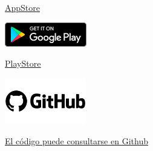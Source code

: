 \documentclass[conference]{IEEEtran}
\begin{document}
\begin{center}
    \href{https://apps.apple.com/mx/app/shannon-entropy/id1566482675}{\underline{AppStore}}
\end{center}


\begin{center}
    \includegraphics{google-play-badge.png}
\end{center}

\begin{center}
    \href{https://play.google.com/store/apps/details?id=com.jonathangg.shannonentropy}{\underline{PlayStore}}    
\end{center}


\begin{center}
    \includegraphics[height=2cm]{github.png}
\end{center}
\begin{center}
    \href{https://play.google.com/store/apps/details?id=com.jonathangg.shannonentropy}{\underline{El código puede consultarse en Github}}    
\end{center}
\end{document}
